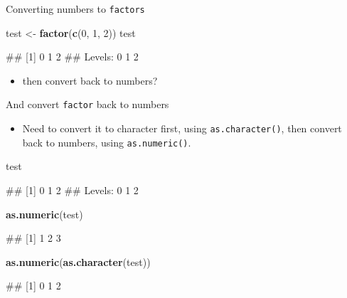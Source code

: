 \documentclass[ignorenonframetext,]{beamer}
\newenvironment{Shaded}{\begin{snugshade}}{\end{snugshade}}
\newcommand{\KeywordTok}[1]{\textcolor[rgb]{0.13,0.29,0.53}{\textbf{#1}}}
\newcommand{\DecValTok}[1]{\textcolor[rgb]{0.00,0.00,0.81}{#1}}
\newcommand{\StringTok}[1]{\textcolor[rgb]{0.31,0.60,0.02}{#1}}
\newcommand{\NormalTok}[1]{#1}
\providecommand{\tightlist}{%
  \setlength{\itemsep}{0pt}\setlength{\parskip}{0pt}}
\let\oldShaded\Shaded
\let\endoldShaded\endShaded
\renewenvironment{Shaded}{\footnotesize\oldShaded}{\endoldShaded}
\let\oldverbatim\verbatim
\let\endoldverbatim\endverbatim
\renewenvironment{verbatim}{\footnotesize\oldverbatim}{\endoldverbatim}
\begin{document}
\begin{frame}[fragile]{Converting numbers to \texttt{factors}}

\begin{Shaded}
\begin{Highlighting}[]
\NormalTok{test <-}\StringTok{ }\KeywordTok{factor}\NormalTok{(}\KeywordTok{c}\NormalTok{(}\DecValTok{0}\NormalTok{, }\DecValTok{1}\NormalTok{, }\DecValTok{2}\NormalTok{))}
\NormalTok{test}
\end{Highlighting}
\end{Shaded}

\begin{verbatim}
## [1] 0 1 2
## Levels: 0 1 2
\end{verbatim}

\begin{itemize}
\tightlist
\item
  then convert back to numbers?
\end{itemize}

\end{frame}

\begin{frame}[fragile]{And convert \texttt{factor} back to numbers}

\begin{itemize}
\tightlist
\item
  Need to convert it to character first, using \texttt{as.character()},
  then convert back to numbers, using \texttt{as.numeric()}.
\end{itemize}

\begin{Shaded}
\begin{Highlighting}[]
\NormalTok{test}
\end{Highlighting}
\end{Shaded}

\begin{verbatim}
## [1] 0 1 2
## Levels: 0 1 2
\end{verbatim}

\begin{Shaded}
\begin{Highlighting}[]
\KeywordTok{as.numeric}\NormalTok{(test)}
\end{Highlighting}
\end{Shaded}

\begin{verbatim}
## [1] 1 2 3
\end{verbatim}

\begin{Shaded}
\begin{Highlighting}[]
\KeywordTok{as.numeric}\NormalTok{(}\KeywordTok{as.character}\NormalTok{(test))}
\end{Highlighting}
\end{Shaded}

\begin{verbatim}
## [1] 0 1 2
\end{verbatim}

\end{frame}
\end{document}
